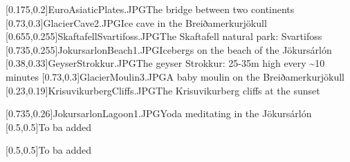 



\graphicspath{{Figures/}{Figures/Iceland/}}


\subtitle{Day 2}
\date{27.10.2019}


    
    [0.175,0.2]{EuroAsiaticPlates.JPG}{The bridge between two continents}
    [0.73,0.3]{GlacierCave2.JPG}{Ice cave in the Breiðamerkurj\"okull}
    [0.655,0.255]{SkaftafellSvartifoss.JPG}{The Skaftafell natural park: Svartifoss}
    [0.735,0.255]{JokursarlonBeach1.JPG}{Icebergs on the beach of the J\"okurs\'arl\'on}
    [0.38,0.33]{GeyserStrokkur.JPG}{The geyser Strokkur: 25-35m high every \textasciitilde10 minutes}
    [0.73,0.3]{GlacierMoulin3.JPG}{A baby moulin on the Breiðamerkurj\"okull}
    [0.23,0.19]{KrisuvikurbergCliffs.JPG}{The Krisuvikurberg cliffs at the sunset}
    
    [0.735,0.26]{JokursarlonLagoon1.JPG}{Yoda meditating in the J\"okurs\'arl\'on}
    [0.5,0.5]{}{To ba added}
    
    [0.5,0.5]{}{To ba added}
    
    

